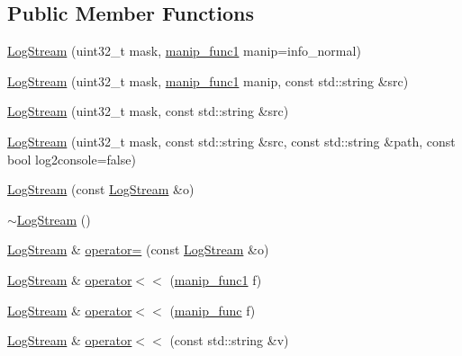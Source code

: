 \subsection*{Public Member Functions}
\begin{DoxyCompactItemize}
\item 
\hyperlink{classkisscpp_1_1_log_stream_aa16ee9785b0b000ba3bbff0acf431a54}{Log\-Stream} (uint32\-\_\-t mask, \hyperlink{classkisscpp_1_1_log_stream_ab6994c757d4c63c4388a932cf2be2c9d}{manip\-\_\-func1} manip=info\-\_\-normal)
\item 
\hyperlink{classkisscpp_1_1_log_stream_a5ea08d3a0a4b6e4084118208d8635fb0}{Log\-Stream} (uint32\-\_\-t mask, \hyperlink{classkisscpp_1_1_log_stream_ab6994c757d4c63c4388a932cf2be2c9d}{manip\-\_\-func1} manip, const std\-::string \&src)
\item 
\hyperlink{classkisscpp_1_1_log_stream_a556bde63a50cb04bff5efbd7a6260972}{Log\-Stream} (uint32\-\_\-t mask, const std\-::string \&src)
\item 
\hyperlink{classkisscpp_1_1_log_stream_a5b5ff9f6c0291c4cb83fbb86b11d9b56}{Log\-Stream} (uint32\-\_\-t mask, const std\-::string \&src, const std\-::string \&path, const bool log2console=false)
\item 
\hyperlink{classkisscpp_1_1_log_stream_a76dbd7329fb9089fff830a650535085e}{Log\-Stream} (const \hyperlink{classkisscpp_1_1_log_stream}{Log\-Stream} \&o)
\item 
\hyperlink{classkisscpp_1_1_log_stream_ae2b779d35193c4eb8dbefd4c0ae5e51b}{$\sim$\-Log\-Stream} ()
\item 
\hyperlink{classkisscpp_1_1_log_stream}{Log\-Stream} \& \hyperlink{classkisscpp_1_1_log_stream_a36c0df879f5c8aad154c7989cacf72c3}{operator=} (const \hyperlink{classkisscpp_1_1_log_stream}{Log\-Stream} \&o)
\item 
\hyperlink{classkisscpp_1_1_log_stream}{Log\-Stream} \& \hyperlink{classkisscpp_1_1_log_stream_a8c5790a046e735254faa31ac5e5be57a}{operator$<$$<$} (\hyperlink{classkisscpp_1_1_log_stream_ab6994c757d4c63c4388a932cf2be2c9d}{manip\-\_\-func1} f)
\item 
\hyperlink{classkisscpp_1_1_log_stream}{Log\-Stream} \& \hyperlink{classkisscpp_1_1_log_stream_a0e172406664a3f1b6da344675795ee22}{operator$<$$<$} (\hyperlink{classkisscpp_1_1_log_stream_abb058ef2b1b57fb7e0b89c3312794ada}{manip\-\_\-func} f)
\item 
\hyperlink{classkisscpp_1_1_log_stream}{Log\-Stream} \& \hyperlink{classkisscpp_1_1_log_stream_a02180d2e0d8f61c26e0b68912f0508c0}{operator$<$$<$} (const std\-::string \&v)

\end{DoxyCompactItemize}
